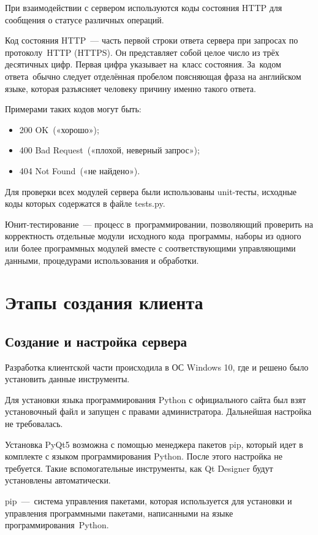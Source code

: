 \documentclass[14pt, a4paper]{extarticle}
\begin{document}
    При взаимодействии с сервером используются коды состояния HTTP для сообщения о статусе различных операций.

    Код состояния HTTP — часть первой строки ответа сервера при запросах по протоколу HTTP (HTTPS). Он представляет собой целое число из трёх десятичных цифр. Первая цифра указывает на класс состояния. За кодом ответа обычно следует отделённая пробелом поясняющая фраза на английском языке, которая разъясняет человеку причину именно такого ответа.

    Примерами таких кодов могут быть:
    \begin{itemize}
        \item 200 OK («хорошо»);
        \item 400 Bad Request («плохой, неверный запрос»);
        \item 404 Not Found («не найдено»).
    \end{itemize}

    Для проверки всех модулей сервера были использованы unit-тесты, исходные коды которых содержатся в файле tests.py.

    Юнит-тестирование — процесс в программировании, позволяющий проверить на корректность отдельные модули исходного кода программы, наборы из одного или более программных модулей вместе с соответствующими управляющими данными, процедурами использования и обработки. 

    \newpage
    \section{Этапы создания клиента}
    \subsection{Создание и настройка сервера}
    Разработка клиентской части происходила в ОС Windows 10, где и решено было установить данные инструменты.

    Для установки языка программирования Python с официального сайта был взят установочный файл и запущен с правами администратора. Дальнейшая настройка не требовалась.

    Установка PyQt5 возможна с помощью менеджера пакетов pip, который идет в комплекте с языком программирования Python. После этого настройка не требуется. Такие вспомогательные инструменты, как Qt Designer будут установлены автоматически.

    pip — система управления пакетами, которая используется для установки и управления программными пакетами, написанными на языке программирования Python.
\end{document}
